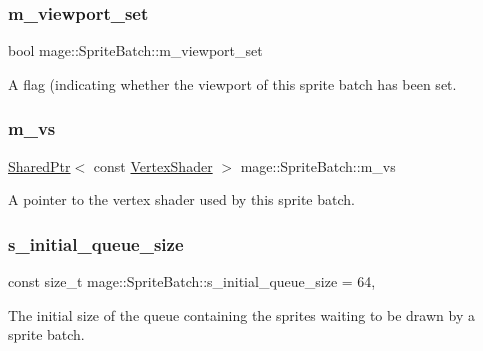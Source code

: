 \subsubsection{\texorpdfstring{m\+\_\+viewport\+\_\+set}{m\_viewport\_set}}
{\footnotesize\ttfamily bool mage\+::\+Sprite\+Batch\+::m\+\_\+viewport\+\_\+set\hspace{0.3cm}{\ttfamily [private]}}

A flag (indicating whether the viewport of this sprite batch has been set. \hypertarget{classmage_1_1_sprite_batch_aaf64bcaa1d98b1029687d2d56ea33f02}{}\label{classmage_1_1_sprite_batch_aaf64bcaa1d98b1029687d2d56ea33f02} 
\subsubsection{\texorpdfstring{m\+\_\+vs}{m\_vs}}
{\footnotesize\ttfamily \hyperlink{namespacemage_a1e01ae66713838a7a67d30e44c67703e}{Shared\+Ptr}$<$ const \hyperlink{classmage_1_1_vertex_shader}{Vertex\+Shader} $>$ mage\+::\+Sprite\+Batch\+::m\+\_\+vs\hspace{0.3cm}{\ttfamily [private]}}

A pointer to the vertex shader used by this sprite batch. \hypertarget{classmage_1_1_sprite_batch_af649a6e9655bb8088d4c5d1e31281927}{}\label{classmage_1_1_sprite_batch_af649a6e9655bb8088d4c5d1e31281927} 
\subsubsection{\texorpdfstring{s\+\_\+initial\+\_\+queue\+\_\+size}{s\_initial\_queue\_size}}
{\footnotesize\ttfamily const size\+\_\+t mage\+::\+Sprite\+Batch\+::s\+\_\+initial\+\_\+queue\+\_\+size = 64\hspace{0.3cm}{\ttfamily [static]}, {\ttfamily [private]}}

The initial size of the queue containing the sprites waiting to be drawn by a sprite batch. 